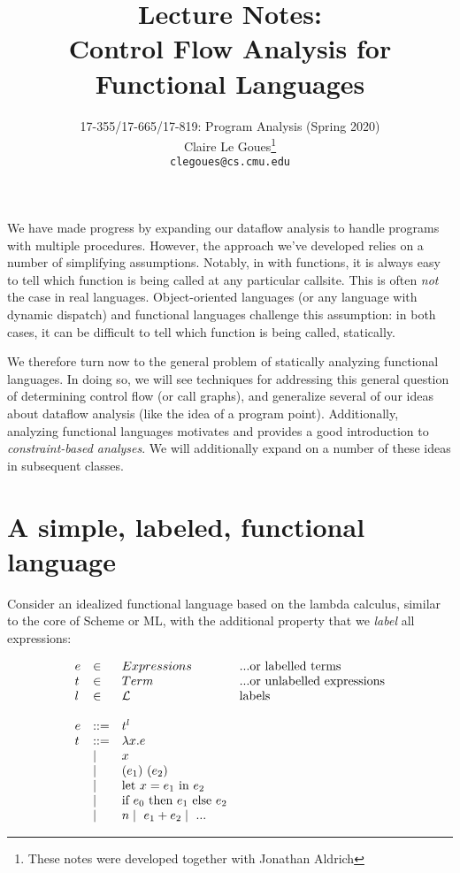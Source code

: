 \documentclass[11pt]{article}
\title{Lecture Notes:\\
		Control Flow Analysis for Functional Languages}
\author{17-355/17-665/17-819: Program Analysis (Spring 2020)\\
        Claire Le Goues\footnote{These notes were developed together with Jonathan Aldrich}\\
		{\tt clegoues@cs.cmu.edu}}
\date{}
\begin{document}
\maketitle

We have made progress by expanding our dataflow analysis to handle programs with
multiple procedures. However, the approach we've developed relies on a number of
simplifying assumptions. Notably, in \WhileThAddr with functions, it is always
easy to tell which function is being called at any particular callsite. This is
often \emph{not} the case in real languages. Object-oriented languages (or any
language with dynamic dispatch) and functional languages challenge this
assumption: in both cases, it can be difficult to tell which function is being
called, statically.

We therefore turn now to the general problem of statically analyzing functional
languages. In doing so, we will see techniques for addressing this general
question of determining control flow (or call graphs), and generalize several of
our ideas about dataflow analysis (like the idea of a program point).
Additionally, analyzing functional languages motivates and provides a good
introduction to \emph{constraint-based analyses}. We will additionally expand on
a number of these ideas in subsequent classes.

\section{A simple, labeled, functional language}

Consider an idealized functional language based on the lambda calculus,
similar to the core of Scheme or ML, with the additional property that we \emph{label} all expressions:

\[
\begin{array}{lllll}
e  & \in & Expressions & \mbox{...or labelled terms} \\
t  & \in & Term  & \mbox{...or unlabelled expressions} \\
l & \in & \mathcal{L} & \mbox{labels} \\
\\
e & ::= & t ^ l \\
t &  ::= & \lambda x . e \\
  & \mathrel{\mid} & x \\
  & \mathrel{\mid} & (e_1) ~ (e_2) \\
  & \mathrel{\mid} & \mbox{let}~x = e_1~\mbox{in}~e_2 \\
  & \mathrel{\mid} & \mbox{if}~e_0~\mbox{then}~e_1~\mbox{else}~e_2 \\
  & \mathrel{\mid} & n \mathrel{\mid}~e_1 + e_2 \mathrel{\mid}~ ... \\
\end{array}
\]
\end{document}
